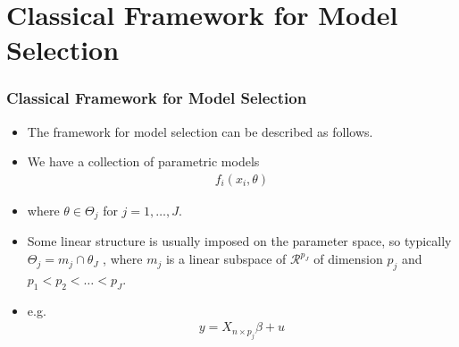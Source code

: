 \documentclass[
  shownotes,
  xcolor={svgnames},
  hyperref={colorlinks,citecolor=DarkBlue,linkcolor=DarkRed,urlcolor=DarkBlue}
  , aspectratio=169]{beamer}
\begin{document}
\section{Classical Framework for Model Selection}
\begin{frame}[fragile]
\frametitle{Classical Framework for Model Selection }

\begin{itemize}
\item The framework for model selection can be described as follows. 

\item We have a collection of parametric models
\begin{align}
{f_i(x_i,\theta)}
\end{align}

\item where $\theta \in \Theta_j$ for $j = 1,\dots, J$.

 \item Some linear structure is usually imposed on the parameter space, so typically $\Theta_j=m_j\cap\theta_J$ , where $m_j$ is a linear subspace of $\mathcal{R}^{p_J}$ of dimension $p_j$ and $p_1 < p_2 < \dots < p_J$. 
\item e.g.
\begin{align}
y=X_{n\times p_j}\beta+u
\end{align}
\end{itemize}

\end{frame}
\end{document}
